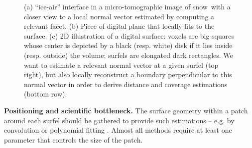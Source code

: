 \begin{figure}[hb]
 \caption{(a) ``ice-air'' interface in a micro-tomographic image of snow\protect\footnotemark~with a closer view to a local normal vector estimated by computing a relevant facet. (b) Piece of digital plane that locally fits to the surface. (c) 2D illustration of a digital surface: voxels are big squares whose center is depicted by a black (resp. white) disk if it lies inside (resp. outside) the volume; surfels are elongated dark rectangles. We want to estimate a relevant normal vector at a given surfel (top right), but also locally reconstruct a boundary perpendicular to this normal vector in order to derive distance and coverage estimations (bottom row).} 
\label{fig:ex} 
\end{figure}

\noindent\textbf{Positioning and scientific bottleneck.}
The surface geometry within a patch around each surfel should be gathered to provide such estimations -- e.g. by convolution \cite{Pottmann2009} or polynomial fitting \cite{Cazals2008}.
Almost all methods require at least one parameter that controls the size of the patch.  

